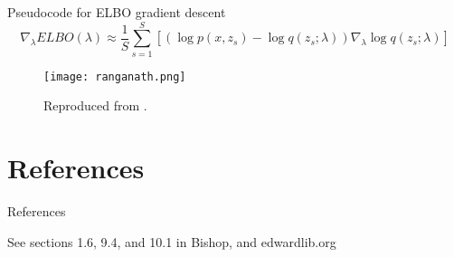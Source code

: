 \documentclass{beamer}
\begin{document}
\begin{frame}{Pseudocode for ELBO gradient descent}
  \[\nabla_\lambda ELBO(\lambda) \approx \frac{1}{S} \sum_{s=1}^{S} \left[ \left( \log p(x, z_s) - \log q(z_s; \lambda)\right) \nabla_\lambda \log q(z_s; \lambda) \right]\]
  \begin{figure}
    \texttt{[image: ranganath.png]}
    \caption{Reproduced from \cite{ranganath2014}.}
  \end{figure}
\end{frame}

    
\section{References}
\begin{frame}{References}
  \begin{block}{See sections 1.6, 9.4, and 10.1 in Bishop, and edwardlib.org}
    \AtNextBibliography{\small}
    \printbibliography
  \end{block}
\end{frame}

\end{document}
